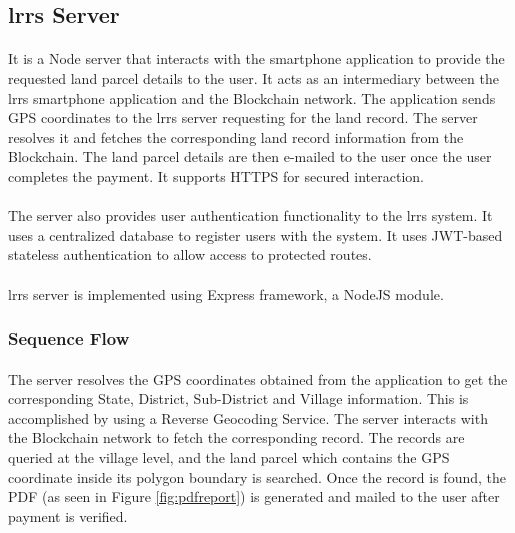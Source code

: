 \documentclass{article}
\begin{document}
    \subsection{\gls{lrrs} Server}
        \paragraph{}
        It is a Node server that interacts with the smartphone application to provide the requested land parcel details to the user. It acts as an intermediary between the \gls{lrrs} smartphone application and the Blockchain network. The application sends GPS coordinates to the \gls{lrrs} server requesting for the land record. The server resolves it and fetches the corresponding land record information from the Blockchain. The land parcel details are then e-mailed to the user once the user completes the payment. It supports HTTPS for secured interaction.
        
        \paragraph{}
        The server also provides user authentication functionality to the \gls{lrrs} system. It uses a centralized database to register users with the system. It uses JWT-based stateless authentication to allow access to protected routes.

        \paragraph{}
        \gls{lrrs} server is implemented using Express framework, a NodeJS module.
        
        \subsubsection{Sequence Flow}
        \paragraph{}
        The server resolves the GPS coordinates obtained from the application to get the corresponding State, District, Sub-District and Village information. This is accomplished by using a Reverse Geocoding Service. The server interacts with the Blockchain network to fetch the corresponding record. The records are queried at the village level, and the land parcel which contains the GPS coordinate inside its polygon boundary is searched. Once the record is found, the PDF (as seen in Figure \ref{fig:pdfreport}) is generated and mailed to the user after payment is verified.
\end{document}
